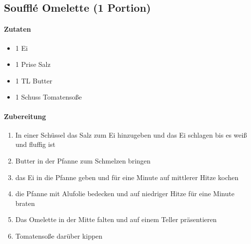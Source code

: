 \newpage
\subsection{Soufflé Omelette (1 Portion)}
\paragraph{Zutaten}
\begin{itemize}[noitemsep]
	\item 1 Ei
	\item 1 Prise Salz
	\item 1 TL Butter
	\item 1 Schuss Tomatensoße
\end{itemize}
\paragraph{Zubereitung}
\begin{enumerate}
	\item In einer Schüssel das Salz zum Ei hinzugeben und das Ei schlagen bis es weiß und fluffig ist
	\item Butter in der Pfanne zum Schmelzen bringen
	\item das Ei in die Pfanne geben und für eine Minute auf mittlerer Hitze kochen
	\item die Pfanne mit Alufolie bedecken und auf niedriger Hitze für eine Minute braten
	\item Das Omelette in der Mitte falten und auf einem Teller präsentieren
	\item Tomatensoße darüber kippen
\end{enumerate}
